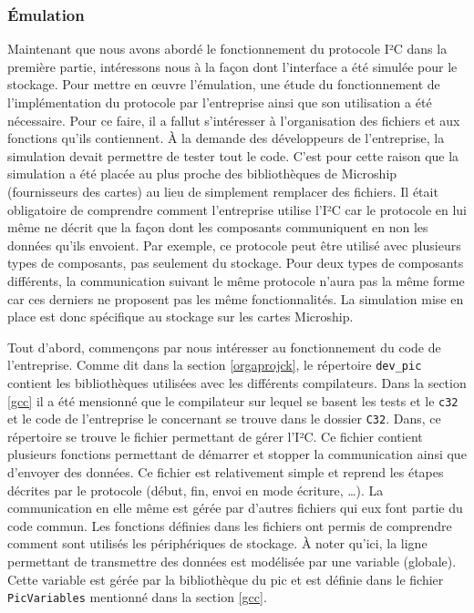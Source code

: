\documentclass[a4paper]{article}
\begin{document}
\subsubsection*{Émulation}

Maintenant que nous avons abordé le fonctionnement du protocole I²C dans la
première partie, intéressons nous à la façon dont l'interface a été simulée pour
le stockage. Pour mettre en œuvre l'émulation, une étude du fonctionnement de
l'implémentation du protocole par l'entreprise ainsi que son utilisation a été
nécessaire. Pour ce faire, il a fallut s'intéresser à l'organisation des
fichiers et aux fonctions qu'ils contiennent. À la demande des développeurs de
l'entreprise, la simulation devait permettre de tester tout le code. C'est pour
cette raison que la simulation a été placée au plus proche des bibliothèques de
Microship (fournisseurs des cartes) au lieu de simplement remplacer des
fichiers. Il était obligatoire de comprendre comment l'entreprise utilise l'I²C
car le protocole en lui même ne décrit que la façon dont les composants
communiquent en non les données qu'ils envoient. Par exemple, ce protocole peut
être utilisé avec plusieurs types de composants, pas seulement du stockage. Pour
deux types de composants différents, la communication suivant le même protocole
n'aura pas la même forme car ces derniers ne proposent pas les même
fonctionnalités. La simulation mise en place est donc spécifique au stockage sur
les cartes Microship.

Tout d'abord, commençons par nous intéresser au fonctionnement du code de
l'entreprise. Comme dit dans la section \ref{orgaprojck}, le répertoire
\verb|dev_pic| contient les bibliothèques utilisées avec les différents
compilateurs. Dans la section \ref{gcc} il a été mensionné que le compilateur
sur lequel se basent les tests et le \verb|c32| et le code de l'entreprise le
concernant se trouve dans le dossier \verb|C32|. Dans, ce répertoire se trouve
le fichier permettant de gérer l'I²C. Ce fichier contient plusieurs fonctions
permettant de démarrer et stopper la communication ainsi que d'envoyer des
données. Ce fichier est relativement simple et reprend les étapes décrites par
le protocole (début, fin, envoi en mode écriture, \dots). La communication en
elle même est gérée par d'autres fichiers qui eux font partie du code commun.
Les fonctions définies dans les fichiers ont permis de comprendre comment sont
utilisés les périphériques de stockage. À noter qu'ici, la ligne permettant de
transmettre des données est modélisée par une variable (globale). Cette variable
est gérée par la bibliothèque du \gls{pic} et est définie dans le fichier
\verb|PicVariables| mentionné dans la section \ref{gcc}.
\end{document}
